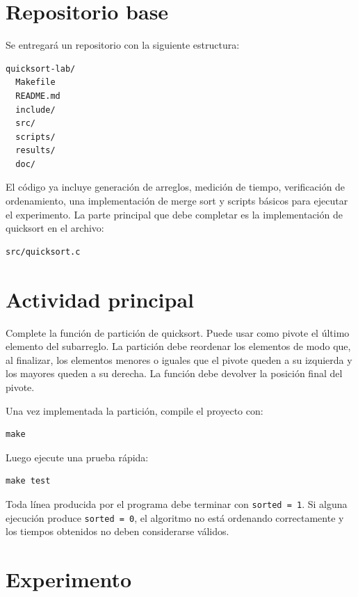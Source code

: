 \documentclass[11pt,a4paper]{article}
\begin{document}
\section{Repositorio base}

Se entregará un repositorio con la siguiente estructura:

\begin{verbatim}
quicksort-lab/
  Makefile
  README.md
  include/
  src/
  scripts/
  results/
  doc/
\end{verbatim}

El código ya incluye generación de arreglos, medición de tiempo, verificación de ordenamiento, una implementación de merge sort y scripts básicos para ejecutar el experimento. La parte principal que debe completar es la implementación de quicksort en el archivo:

\begin{verbatim}
src/quicksort.c
\end{verbatim}

\section{Actividad principal}

Complete la función de partición de quicksort. Puede usar como pivote el último elemento del subarreglo. La partición debe reordenar los elementos de modo que, al finalizar, los elementos menores o iguales que el pivote queden a su izquierda y los mayores queden a su derecha. La función debe devolver la posición final del pivote.

Una vez implementada la partición, compile el proyecto con:

\begin{verbatim}
make
\end{verbatim}

Luego ejecute una prueba rápida:

\begin{verbatim}
make test
\end{verbatim}

Toda línea producida por el programa debe terminar con \texttt{sorted = 1}. Si alguna ejecución produce \texttt{sorted = 0}, el algoritmo no está ordenando correctamente y los tiempos obtenidos no deben considerarse válidos.

\section{Experimento}
\end{document}

